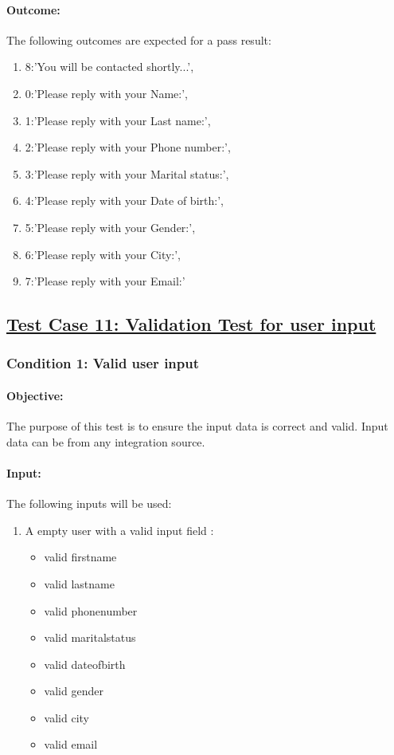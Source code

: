 \documentclass{article}
\begin{document}
\paragraph{Outcome:} The following outcomes are expected for a pass result:
\begin{enumerate}
	 \item 8:'You will be contacted shortly...',
     \item 0:'Please reply with your Name:',
     \item 1:'Please reply with your Last name:',
     \item 2:'Please reply with your Phone number:',
     \item 3:'Please reply with your Marital status:',
     \item 4:'Please reply with your Date of birth:',
     \item 5:'Please reply with your Gender:',
     \item 6:'Please reply with your City:',
     \item 7:'Please reply with your Email:'
\end{enumerate}

\pagebreak

\subsection{\underline{Test Case 11: Validation Test for user input}}\label{test11}
\subsubsection{Condition 1: Valid user input}
\paragraph{Objective:} The purpose of this test is to ensure the input data is correct and valid. Input data can be from any integration source.
\paragraph{Input:} The following inputs will be used:
\begin{enumerate}
	\item A empty user with a valid input field :
	\begin{itemize}
  	\item valid firstname
    \item valid lastname
    \item valid phonenumber
    \item valid maritalstatus
    \item valid dateofbirth
    \item valid gender
    \item valid city 
    \item valid email
    \end{itemize}	  
\end{enumerate}
\end{document}

